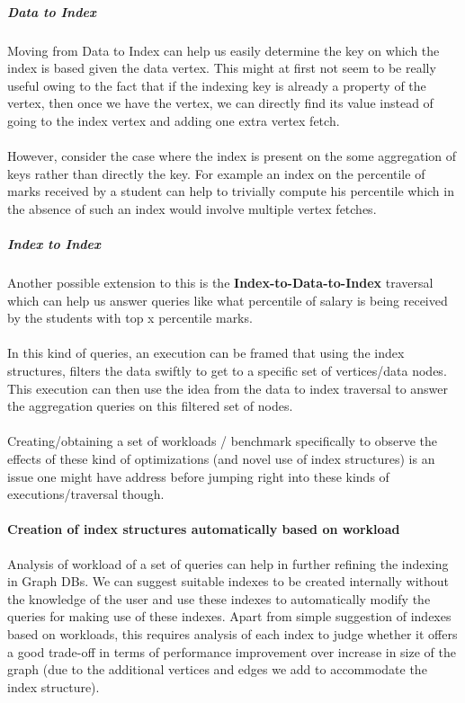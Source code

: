 \subparagraph{Data to Index}
$\:$\\
Moving from Data to Index can help us easily determine the key on which the index is based given the data vertex. This might at first not seem to be really useful owing to the fact that if the indexing key is already a property of the vertex, then once we have the vertex, we can directly find its value instead of going to the index vertex and adding one extra vertex fetch.\\
\\
However, consider the case where the index is present on the some aggregation of keys rather than directly the key. For example an index on the percentile of marks received by a student can help to trivially compute his percentile which in the absence of such an index would involve multiple vertex fetches.

\subparagraph{Index to Index}
$\:$\\
Another possible extension to this is the \textbf{Index-to-Data-to-Index} traversal which can help us answer queries like what percentile of salary is being received by the students with top x percentile marks.\\
\\
In this kind of queries, an execution can be framed that using the index structures, filters the data swiftly to get to a specific set of vertices/data nodes. This execution can then use the idea from the data to index traversal to answer the aggregation queries on this filtered set of nodes.\\
\\
Creating/obtaining a set of workloads / benchmark specifically to observe the effects of these kind of optimizations (and novel use of index structures) is an issue one might have address before jumping right into these kinds of executions/traversal though.

\paragraph{Creation of  index structures automatically based on workload}
$\:$\\
Analysis of workload of a set of queries can help in further refining the indexing in Graph DBs. We can suggest suitable indexes to be created internally without the knowledge of the user and use these indexes to automatically modify the queries for making use of these indexes. Apart from simple suggestion of indexes based on workloads, this requires analysis of each index to judge whether it offers a good trade-off in terms of performance improvement over increase in size of the graph (due to the additional vertices and edges we add to accommodate the index structure).